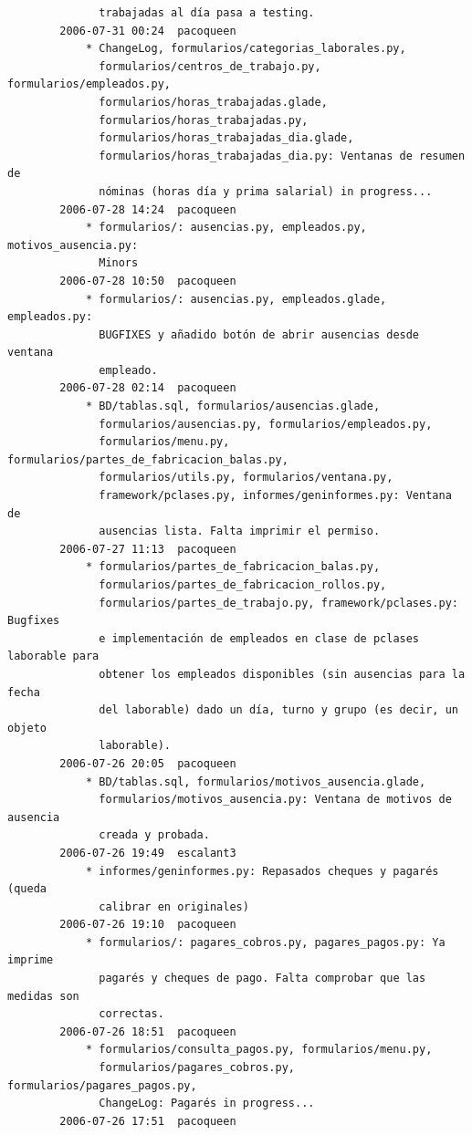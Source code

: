 \documentclass[a4paper]{article}
\begin{document}
\begin{verbatim}
              trabajadas al día pasa a testing.
        2006-07-31 00:24  pacoqueen
            * ChangeLog, formularios/categorias_laborales.py,
              formularios/centros_de_trabajo.py, formularios/empleados.py,
              formularios/horas_trabajadas.glade,
              formularios/horas_trabajadas.py,
              formularios/horas_trabajadas_dia.glade,
              formularios/horas_trabajadas_dia.py: Ventanas de resumen de
              nóminas (horas día y prima salarial) in progress...
        2006-07-28 14:24  pacoqueen
            * formularios/: ausencias.py, empleados.py, motivos_ausencia.py:
              Minors
        2006-07-28 10:50  pacoqueen
            * formularios/: ausencias.py, empleados.glade, empleados.py:
              BUGFIXES y añadido botón de abrir ausencias desde ventana
              empleado.
        2006-07-28 02:14  pacoqueen
            * BD/tablas.sql, formularios/ausencias.glade,
              formularios/ausencias.py, formularios/empleados.py,
              formularios/menu.py, formularios/partes_de_fabricacion_balas.py,
              formularios/utils.py, formularios/ventana.py,
              framework/pclases.py, informes/geninformes.py: Ventana de
              ausencias lista. Falta imprimir el permiso.
        2006-07-27 11:13  pacoqueen
            * formularios/partes_de_fabricacion_balas.py,
              formularios/partes_de_fabricacion_rollos.py,
              formularios/partes_de_trabajo.py, framework/pclases.py: Bugfixes
              e implementación de empleados en clase de pclases laborable para
              obtener los empleados disponibles (sin ausencias para la fecha
              del laborable) dado un día, turno y grupo (es decir, un objeto
              laborable).
        2006-07-26 20:05  pacoqueen
            * BD/tablas.sql, formularios/motivos_ausencia.glade,
              formularios/motivos_ausencia.py: Ventana de motivos de ausencia
              creada y probada.
        2006-07-26 19:49  escalant3
            * informes/geninformes.py: Repasados cheques y pagarés (queda
              calibrar en originales)
        2006-07-26 19:10  pacoqueen
            * formularios/: pagares_cobros.py, pagares_pagos.py: Ya imprime
              pagarés y cheques de pago. Falta comprobar que las medidas son
              correctas.
        2006-07-26 18:51  pacoqueen
            * formularios/consulta_pagos.py, formularios/menu.py,
              formularios/pagares_cobros.py, formularios/pagares_pagos.py,
              ChangeLog: Pagarés in progress...
        2006-07-26 17:51  pacoqueen

\end{verbatim}
\end{document}
